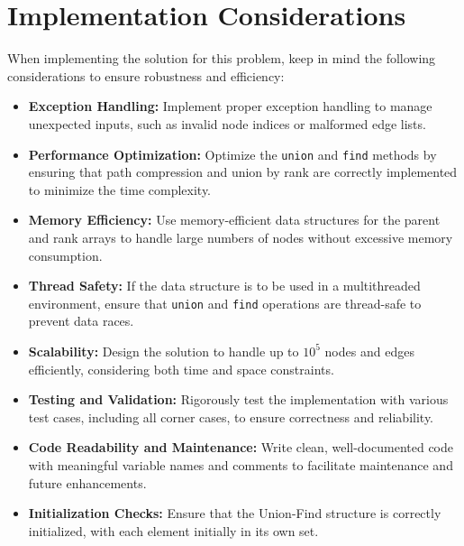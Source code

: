 \section*{Implementation Considerations}

When implementing the solution for this problem, keep in mind the following considerations to ensure robustness and efficiency:

\begin{itemize}
    \item \textbf{Exception Handling:}  
    Implement proper exception handling to manage unexpected inputs, such as invalid node indices or malformed edge lists.
    
    \item \textbf{Performance Optimization:}  
    Optimize the \texttt{union} and \texttt{find} methods by ensuring that path compression and union by rank are correctly implemented to minimize the time complexity.
    
    \item \textbf{Memory Efficiency:}  
    Use memory-efficient data structures for the parent and rank arrays to handle large numbers of nodes without excessive memory consumption.
    
    \item \textbf{Thread Safety:}  
    If the data structure is to be used in a multithreaded environment, ensure that \texttt{union} and \texttt{find} operations are thread-safe to prevent data races.
    
    \item \textbf{Scalability:}  
    Design the solution to handle up to \(10^5\) nodes and edges efficiently, considering both time and space constraints.
    
    \item \textbf{Testing and Validation:}  
    Rigorously test the implementation with various test cases, including all corner cases, to ensure correctness and reliability.
    
    \item \textbf{Code Readability and Maintenance:} 
    Write clean, well-documented code with meaningful variable names and comments to facilitate maintenance and future enhancements.
    
    \item \textbf{Initialization Checks:}  
    Ensure that the Union-Find structure is correctly initialized, with each element initially in its own set.
\end{itemize}


